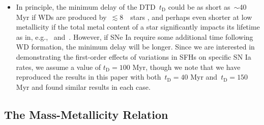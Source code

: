 \documentclass[ms.tex]{subfiles}
\begin{document}
\begin{itemize}
	\item In principle, the minimum delay of the DTD~$t_\text{D}$ could be as
	short as~$\sim$40 Myr if WDs are produced by~$\lesssim$8~\msun~stars
	\citep*[e.g.][]{Hurley2000}, and perhaps even shorter at low metallicity if
	the total metal content of a star significantly impacts its lifetime as in,
	e.g.,~\citet{Kodama1997} and~\citet{Vincenzo2016}.
	However, if SNe Ia require some additional time following WD formation, the
	minimum delay will be longer.
	Since we are interested in demonstrating the first-order effects of
	variations in SFHs on specific SN Ia rates, we assume a value of
	$t_\text{D} = 100$ Myr, though we note that we have reproduced the results
	in this paper with both~$t_\text{D} = 40$ Myr and~$t_\text{D} = 150$ Myr
	and found similar results in each case.

\end{itemize}

\subsection{The Mass-Metallicity Relation}
\label{sec:galprops:mzr}
\end{document}
